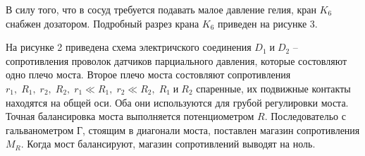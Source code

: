 \documentclass[a4paper,12pt]{article} %
\begin{document}
В силу того, что в сосуд требуется подавать малое давление гелия, кран $K_6$ снабжен дозатором. Подробный разрез крана $K_6$ приведен на рисунке 3.

На рисунке 2 приведена схема электричского соединения $D_1 \; \text{и} \; D_2$ -- сопротивления проволок датчиков парциального давления, которые состовляют одно плечо моста. Второе плечо моста состовляют сопротивления $r_1, \; R_1, \; r_2, \; R_2, \; r_1 \ll R_1, \; r_2 \ll R_2, \; R_1 \; \text{и} \; R_2$ спаренные, их подвижные контакты находятся на общей оси. Оба они используются для грубой регулировки моста. Точная балансировка моста выполняется потенциометром $R$. Последовательо с гальванометром Г, стоящим в диагонали моста, поставлен магазин сопротивления $M_R$. Когда мост балансируют, магазин сопротивлений выводят на ноль. 
\end{document}

